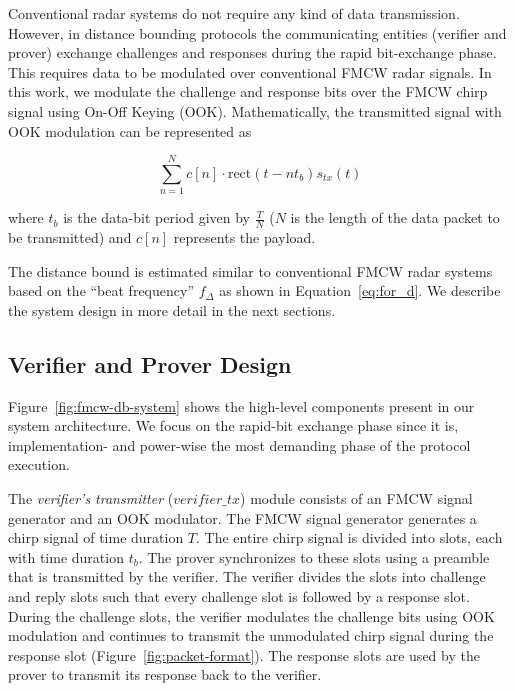 \documentclass{sig-alternate-10pt}
\begin{document}
Conventional radar systems do not require any kind of data transmission.
However, in distance bounding protocols the communicating entities (verifier and
prover) exchange challenges and responses during the rapid bit-exchange phase.
This requires data to be modulated over conventional FMCW radar signals. In this
work, we modulate the challenge and response bits over the FMCW chirp signal
using On-Off Keying (OOK). Mathematically, the transmitted signal with OOK
modulation can be represented as

\begin{equation}
  \label{eq:ask-fmcw}
  \sum_{n=1}^Nc[n] \cdot \mathrm{rect}(t-nt_b) s_{tx}(t)
\end{equation}

where $t_b$ is the data-bit period given by $\frac{T}{N}$ ($N$ is the length
of the data packet to be transmitted) and $c[n]$ represents the payload.

The distance bound is estimated similar to conventional FMCW radar systems based
on the ``beat frequency'' $f_{\Delta}$ as shown in Equation~\eqref{eq:for_d}. We
describe the system design in more detail in the next sections.


\subsection{Verifier and Prover Design}
\label{subssec:sys-design}
Figure~\ref{fig:fmcw-db-system} shows the high-level components present in our
system architecture. We focus on the rapid-bit exchange phase since it is,
implementation- and power-wise the most demanding phase of the protocol
execution.

The \emph{verifier's transmitter} ($verifier\_tx$) module consists of an FMCW
signal generator and an OOK modulator. The FMCW signal generator generates a
chirp signal of time duration $T$. The entire chirp signal is divided into
slots, each with time duration $t_b$. The prover synchronizes to these slots
using a preamble that is transmitted by the verifier. The verifier divides the
slots into challenge and reply slots such that every challenge slot is followed
by a response slot. During the challenge slots, the verifier modulates the
challenge bits using OOK modulation and continues to transmit the unmodulated
chirp signal during the response slot (Figure~\ref{fig:packet-format}). The
response slots are used by the prover to transmit its response back to the
verifier. 
\end{document}
